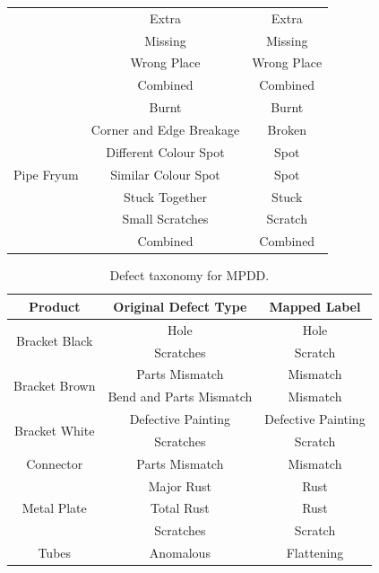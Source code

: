 \begin{table}
\begin{tabular}{@{}ccc@{}}
 & Extra & Extra \\
 & Missing & Missing \\
 & Wrong Place & Wrong Place \\
 & Combined & Combined \\
\midrule
\multirow{7}{*}{Pipe Fryum} & Burnt & Burnt \\
 & Corner and Edge Breakage & Broken \\
 & Different Colour Spot & Spot \\
 & Similar Colour Spot & Spot \\
 & Stuck Together & Stuck \\
 & Small Scratches & Scratch \\
 & Combined & Combined \\
\bottomrule
\end{tabular}
\end{table}

\begin{table}
\centering
\footnotesize
\caption{Defect taxonomy for MPDD.}
\label{tab:mpdd-mapping}
\begin{tabular}{@{}ccc@{}}
\toprule
\textbf{Product} & \textbf{Original Defect Type} & \textbf{Mapped Label} \\
\midrule
\multirow{2}{*}{Bracket Black} & Hole & Hole \\
 & Scratches & Scratch \\
\midrule
\multirow{2}{*}{Bracket Brown} & Parts Mismatch & Mismatch \\
 & Bend and Parts Mismatch & Mismatch \\
\midrule
\multirow{2}{*}{Bracket White} & Defective Painting & Defective Painting \\
 & Scratches & Scratch \\
\midrule
\multirow{1}{*}{Connector} & Parts Mismatch & Mismatch \\
\midrule
\multirow{3}{*}{Metal Plate} & Major Rust & Rust \\
 & Total Rust & Rust \\
 & Scratches & Scratch \\
\midrule
\multirow{1}{*}{Tubes} & Anomalous & Flattening \\
\bottomrule
\end{tabular}
\end{table}

